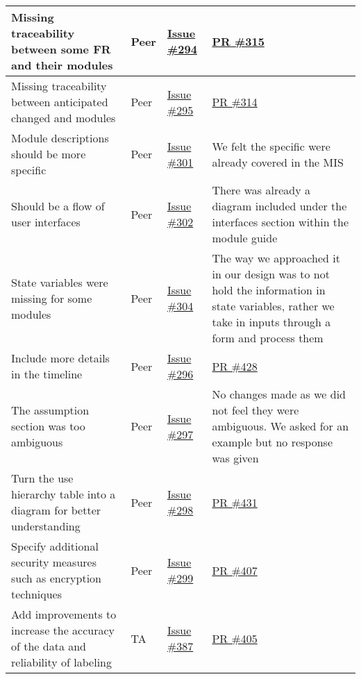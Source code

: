 \documentclass{article}
\begin{document}
\begin{longtable}{|p{5cm}|p{1.5cm}|p{2cm}|p{5cm}|}
Missing traceability between some FR and their modules & Peer & \href{https://github.com/OKKM-insights/OKKM.insights/issues/294}{Issue \#294} & \href{https://github.com/OKKM-insights/OKKM.insights/pull/315}{PR \#315} \\ \hline
Missing traceability between anticipated changed and modules & Peer & \href{https://github.com/OKKM-insights/OKKM.insights/issues/295}{Issue \#295} & \href{https://github.com/OKKM-insights/OKKM.insights/pull/314}{PR \#314} \\ \hline
Module descriptions should be more specific & Peer & \href{https://github.com/OKKM-insights/OKKM.insights/issues/301}{Issue \#301} & We felt the specific were already covered in the MIS \\ \hline
Should be a flow of user interfaces & Peer & \href{https://github.com/OKKM-insights/OKKM.insights/issues/302}{Issue \#302} & There was already a diagram included under the interfaces section within the module guide \\ \hline
State variables were missing for some modules & Peer & \href{https://github.com/OKKM-insights/OKKM.insights/issues/304}{Issue \#304} & The way we approached it in our design was to not hold the information in state variables, rather we take in inputs through a form and process them \\ \hline
Include more details in the timeline & Peer & \href{https://github.com/OKKM-insights/OKKM.insights/issues/296}{Issue \#296} & \href{https://github.com/OKKM-insights/OKKM.insights/pull/428}{PR \#428} \\ \hline
The assumption section was too ambiguous & Peer & \href{https://github.com/OKKM-insights/OKKM.insights/issues/297}{Issue \#297} & No changes made as we did not feel they were ambiguous. We asked for an example but no response was given \\ \hline
Turn the use hierarchy table into a diagram for better understanding & Peer & \href{https://github.com/OKKM-insights/OKKM.insights/issues/298}{Issue \#298} & \href{https://github.com/OKKM-insights/OKKM.insights/pull/431}{PR \#431} \\ \hline
Specify additional security measures such as encryption techniques & Peer & \href{https://github.com/OKKM-insights/OKKM.insights/issues/299}{Issue \#299} & \href{https://github.com/OKKM-insights/OKKM.insights/pull/407}{PR \#407}  \\ \hline
Add improvements to increase the accuracy of the data and reliability of labeling & TA & \href{https://github.com/OKKM-insights/OKKM.insights/issues/387}{Issue \#387} & \href{https://github.com/OKKM-insights/OKKM.insights/pull/405}{PR \#405} \\ \hline

\end{longtable}
\end{document}
